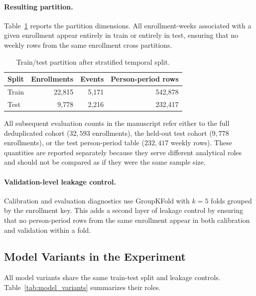 \paragraph*{Resulting partition.}
Table~\ref{tab:split_counts} reports the partition dimensions. All enrollment-weeks associated with a given enrollment appear entirely in train or entirely in test, ensuring that no weekly rows from the same enrollment cross partitions.

\begin{table}[!t]
\centering
\caption{Train/test partition after stratified temporal split.}
\label{tab:split_counts}
\begin{tabular}{lrrr}
\hline
Split & Enrollments & Events & Person-period rows \\
\hline
Train & 22{,}815 & 5{,}171 & 542{,}878 \\
Test  &  9{,}778 & 2{,}216 & 232{,}417 \\
\hline
\end{tabular}
\end{table}

All subsequent evaluation counts in the manuscript refer either to the full deduplicated cohort ($32{,}593$ enrollments), the held-out test cohort ($9{,}778$ enrollments), or the test person-period table ($232{,}417$ weekly rows). These quantities are reported separately because they serve different analytical roles and should not be compared as if they were the same sample size.

\paragraph*{Validation-level leakage control.}
Calibration and evaluation diagnostics use GroupKFold with $k=5$ folds grouped by the enrollment key. This adds a second layer of leakage control by ensuring that no person-period rows from the same enrollment appear in both calibration and validation within a fold.

\subsection{Model Variants in the Experiment}
\label{subsec:model_variants}

All model variants share the same train-test split and leakage controls. Table~\ref{tab:model_variants} summarizes their roles.


